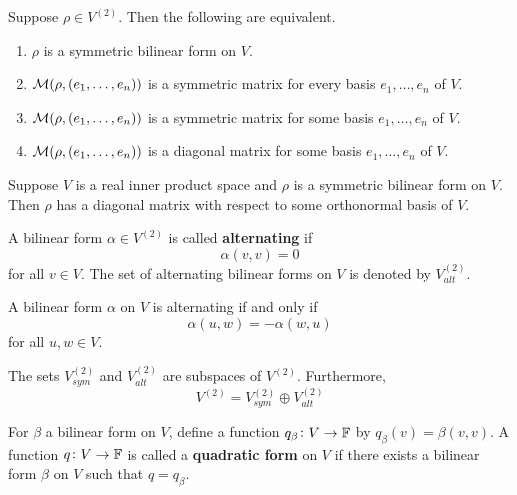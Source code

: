 \documentclass{extarticle}
\begin{document}
\begin{thm}
    Suppose \(\rho \in V^{(2)}\). Then the following are equivalent. 

    \begin{enumerate}[label=(\alph*)]
        \item \(\rho\) is a symmetric bilinear form on \(V\). 
        \item \(\mathcal{M}(\rho, (e_1, \ldots, e_n))\) is a symmetric matrix for every basis \(e_1, \ldots, e_n\) of \(V\). 
        \item \(\mathcal{M}(\rho, (e_1, \ldots, e_n))\) is a symmetric matrix for some basis \(e_1, \ldots, e_n\) of \(V\). 
        \item \(\mathcal{M}(\rho, (e_1, \ldots, e_n))\) is a diagonal matrix for some basis \(e_1, \ldots, e_n\) of \(V\).
    \end{enumerate}
\end{thm}


\begin{thm}
    Suppose \(V\) is a real inner product space and \(\rho\) is a symmetric bilinear form on \(V\). Then 
    \(\rho\) has a diagonal matrix with respect to some orthonormal basis of \(V\).
\end{thm}


\begin{definition}
    A bilinear form \(\alpha \in V^{(2)}\) is called \textbf{alternating} if 
    \[\alpha(v, v) = 0\]
    for all \(v \in V\). The set of alternating bilinear forms on \(V\) is denoted by \(V_{alt}^{(2)}\).
\end{definition}

\begin{lemma}
    A bilinear form \(\alpha\) on \(V\) is alternating if and only if 
    \[\alpha(u, w) = -\alpha(w, u)\]
    for all \(u, w \in V\).
\end{lemma}



\begin{thm}
    The sets \(V_{sym}^{(2)}\) and \(V_{alt}^{(2)}\) are subspaces of \(V^{(2)}\). Furthermore, 
    \[V^{(2)} = V_{sym}^{(2)} \oplus V_{alt}^{(2)}\]
\end{thm}

\begin{definition}
    For \(\beta\) a bilinear form on \(V\), define a function \(q_\beta \colon V \to \mathbb{F}\) by 
    \(q_\beta (v) =\beta(v, v)\). A function \(q \colon V \to \mathbb{F}\) is called a \textbf{quadratic form} 
    on \(V\) if there exists a bilinear form \(\beta\) on \(V\) such that \(q = q_\beta\).
\end{definition}
\end{document}
